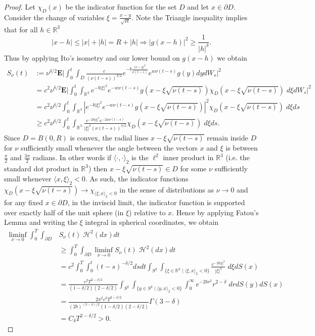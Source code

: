 \documentclass[10pt,a4paper]{amsart}
\def\E{\mathbf{E}}
\def\H{{\mathcal H}}
\def\R{{\mathbb R}} %
\begin{document}
\begin{proof}
    Let $\chi_D(x)$ be the indicator function for the set $D$ and let $x \in \partial D$. Consider the change of variables $\xi = \frac{x-y}{\sqrt{\nu t}}$. Note the Triangle inequality implies that for all $h \in \R^3$
    \[
        |x-h| \leq |x| + |h| = R + |h| \Rightarrow |g(x-h)|^2 \geq \frac{1}{|h|^\delta}.
    \]
    Thus by applying Ito's isometry and our lower bound on $g(x-h)$ we obtain
    \begin{align*}
        S_\nu(t) &:= \nu^{\delta/2}\E\big|\int_0^t\int_D \frac{c}{(\nu (t-s))^{3/2}}e^{-b\frac{|x-y|^2}{\nu (t-s)}}e^{w\nu (t-s)}g(y)dydW_s\big|^2\\
        &= c^2\nu^{\delta/2} \E\big|\int_0^t\int_{\R^3} e^{-b|\xi|^2}e^{-w\nu (t-s)}g(x-\xi\sqrt{\nu (t-s)})\chi_D(x-\xi\sqrt{\nu (t-s)})\;d\xi dW_s\big|^2\\
        &=  c^2\nu^{\delta/2} \int_0^t\int_{\R^3} |e^{-b|\xi|^2}e^{-w\nu (t-s)}g(x-\xi\sqrt{\nu (t-s)})|^2\chi_D(x-\xi\sqrt{\nu (t-s)})\;d\xi ds\\
        &\geq c^2\nu^{\delta/2}\int_0^t\int_{\R^3} \frac{e^{-2b|\xi|^2}e^{-2w\nu (t-s)}}{|\xi|^\delta (\nu (t-s))^{\delta/2}}\chi_D(x-\xi\sqrt{\nu (t-s)})\;d\xi ds.
    \end{align*}
    Since $D = B(0, R)$ is convex, the radial lines $x - \xi\sqrt{\nu (t-s)}$ remain inside $D$ for $\nu$ sufficiently small whenever the angle between the vectors $x$ and $\xi$ is between $\frac{\pi}{2}$ and $\frac{3\pi}{2}$ radians. In other words if $\langle \cdot, \cdot \rangle_2$ is the $\ell^2$ inner product in $\R^3$ (i.e. the standard dot product in $\R^3$) then $x - \xi\sqrt{\nu (t-s)} \in D$ for some $\nu$ sufficiently small whenever $\langle x, \xi\rangle_2 < 0$. As such, the indicator functions $\chi_D(x - \xi\sqrt{\nu (t-s)}) \to \chi_{\langle \xi, x\rangle_2 < 0}$ in the sense of distributions as $\nu \to 0$ and for any fixed $x \in \partial D$, in the inviscid limit, the indicator function is supported over exactly half of the unit sphere (in $\xi$) relative to $x$.
    Hence by applying Fatou's Lemma and writing the $\xi$ integral in spherical coordinates, we obtain
    \begin{align*}
        \liminf_{\nu \to 0} \int_0^T\int_{\partial D} &S_\nu(t)\;\H^2(dx) dt\\
        &\geq \int_0^T\int_{\partial D} \liminf_{\nu \to 0}S_\nu(t)\;\H^2(dx)dt\\
        &= c^2 \int_0^T\int_0^t (t-s)^{-\delta/2}dsdt\int_{S^2} \int_{\{\xi \in \R^3 \mid \langle \xi, x\rangle_2 < 0\}} \frac{e^{-2b|\xi|^2}}{|\xi|^\delta}\;d\xi dS(x)\\
        &= \frac{c^2T^{2-\delta/2}}{(1-\delta/2)(2-\delta/2)}\int_{S^2}\int_{\{y \in S^2 \mid \langle y, x\rangle_2 < 0\}}\int_0^\infty e^{-2br^2}r^{2-\delta}\;drdS(y)dS(x)\\
        &= \frac{2\pi^2c^2T^{2-\delta/2}}{(2b)^{(3-\delta)/2}(1-\delta/2)(2-\delta/2)}\Gamma(3-\delta)\\
        &= C_\delta T^{2-\delta/2} > 0.
    \end{align*}
\end{proof}
\end{document}
